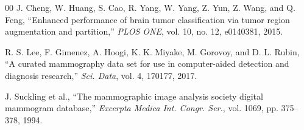 \documentclass[conference]{IEEEtran}
\begin{document}
\begin{thebibliography}{00}
 J. Cheng, W. Huang, S. Cao, R. Yang, W. Yang, Z. Yun, Z. Wang, and Q. Feng, ``Enhanced performance of brain tumor classification via tumor region augmentation and partition,'' \emph{PLOS ONE}, vol. 10, no. 12, e0140381, 2015.

 R. S. Lee, F. Gimenez, A. Hoogi, K. K. Miyake, M. Gorovoy, and D. L. Rubin, ``A curated mammography data set for use in computer-aided detection and diagnosis research,'' \emph{Sci. Data}, vol. 4, 170177, 2017.

 J. Suckling et al., ``The mammographic image analysis society digital mammogram database,'' \emph{Excerpta Medica Int. Congr. Ser.}, vol. 1069, pp. 375--378, 1994.

\end{thebibliography}
\end{document}
